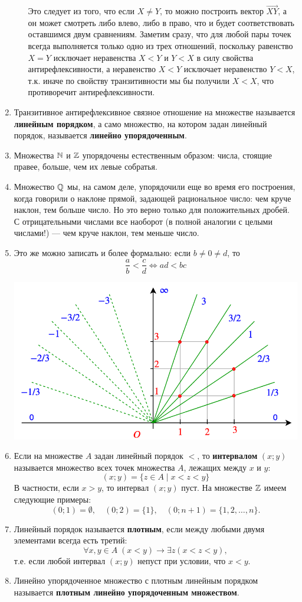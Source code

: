 \begin{enumerate}
\begin{enumerate}[Rel1]
Это следует из того, что если $X\ne Y$, то можно построить вектор $\vec{XY}$, а он может смотреть либо влево, либо в право, что и будет соответствовать оставшимся двум сравнениям. Заметим сразу, что для любой пары точек всегда выполняется только одно из трех отношений, поскольку равенство $X=Y$ исключает неравенства $X<Y$ и $Y<X$ в силу свойства антирефлексивности, а неравенство $X<Y$ исключает неравенство $Y<X$, т.к. иначе по свойству транзитивности мы бы получили $X<X$, что противоречит антирефлексивности.
\end{enumerate}
\item Транзитивное антирефлексивное связное отношение на множестве называется \textbf{линейным порядком}, а само множество, на котором задан линейный порядок, называется \textbf{линейно упорядоченным}.
\item Множества $\mathbb N$ и $\mathbb Z$ упорядочены естественным образом: числа, стоящие правее, больше, чем их левые собратья.
\item Множество $\mathbb Q$ мы, на самом деле, упорядочили еще во время его построения, когда говорили о наклоне прямой, задающей рациональное число: чем круче наклон, тем больше число. Но это верно только для положительных дробей. С отрицательными числами все наоборот (в полной аналогии с целыми числами!) --- чем круче наклон, тем меньше число.
\item Это же можно записать и более формально: если $b\ne 0\ne d$, то
$$
\frac{a}{b}<\frac{c}{d}\Leftrightarrow ad<bc
$$
\begin{center}
\includegraphics[scale=0.3]{ratio.png}
\end{center}
\item Если на множестве $A$ задан линейный порядок $<$, то \textbf{интервалом} $(x;y)$ называется множество всех точек множества $A$, лежащих между $x$ и $y$:
$$
(x;y) = \{z\in A\mid x<z<y\}
$$
В частности, если $x>y$, то интервал $(x;y)$ пуст. На множестве $\mathbb Z$ имеем следующие примеры:
$$
(0;1) = \emptyset,\quad (0;2) = \{1\}, \quad (0;n+1) = \{1,2,\dots, n\}.
$$
\item Линейный порядок называется \textbf{плотным}, если между любыми двумя элементами всегда есть третий: 
$$
\forall x,y\in A\;(x<y)\to\exists z(x<z<y),
$$
т.е. если любой интервал $(x;y)$ непуст при условии, что $x<y$.
\item Линейно упорядоченное множество с плотным линейным порядком называется \textbf{плотным линейно упорядоченным множеством}.

\end{enumerate}


